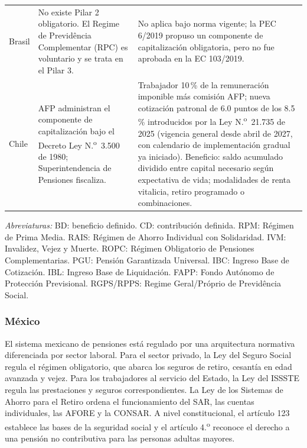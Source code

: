 \documentclass[12pt, letterpaper]{article}
\begin{document}
\begin{xltabular}{\textwidth}{P{1.7cm}Y Y}
Brasil &
No existe Pilar 2 obligatorio. El Regime de Previdência Complementar (RPC) es voluntario y se trata en el Pilar 3. &
No aplica bajo norma vigente; la PEC 6/2019 propuso un componente de capitalización obligatoria, pero no fue aprobada en la EC 103/2019. \\

Chile &
AFP administran el componente de capitalización bajo el Decreto Ley N.\textsuperscript{o}~3.500 de 1980; Superintendencia de Pensiones fiscaliza. &
Trabajador 10\,\% de la remuneración imponible más comisión AFP; nueva cotización patronal de 6.0 puntos de los 8.5\,\% introducidos por la Ley N.\textsuperscript{o}~21.735 de 2025 (vigencia general desde abril de 2027, con calendario de implementación gradual ya iniciado). Beneficio: saldo acumulado dividido entre capital necesario según expectativa de vida; modalidades de renta vitalicia, retiro programado o combinaciones. \\

\end{xltabular}

\begin{small}
\noindent\textit{Abreviaturas:} BD: beneficio definido. CD: contribución definida. RPM: Régimen de Prima Media. RAIS: Régimen de Ahorro Individual con Solidaridad. IVM: Invalidez, Vejez y Muerte. ROPC: Régimen Obligatorio de Pensiones Complementarias. PGU: Pensión Garantizada Universal. IBC: Ingreso Base de Cotización. IBL: Ingreso Base de Liquidación. FAPP: Fondo Autónomo de Protección Previsional. RGPS/RPPS: Regime Geral/Próprio de Previdência Social.
\end{small}

\subsubsection{México}
\label{sec:mexico}

El sistema mexicano de pensiones está regulado por una arquitectura normativa diferenciada por sector laboral. Para el sector privado, la Ley del Seguro Social regula el régimen obligatorio, que abarca los seguros de retiro, cesantía en edad avanzada y vejez. Para los trabajadores al servicio del Estado, la Ley del ISSSTE regula las prestaciones y seguros correspondientes. La Ley de los Sistemas de Ahorro para el Retiro ordena el funcionamiento del SAR, las cuentas individuales, las AFORE y la CONSAR. A nivel constitucional, el artículo 123 establece las bases de la seguridad social y el artículo 4.\textsuperscript{o} reconoce el derecho a una pensión no contributiva para las personas adultas mayores.
\end{document}
